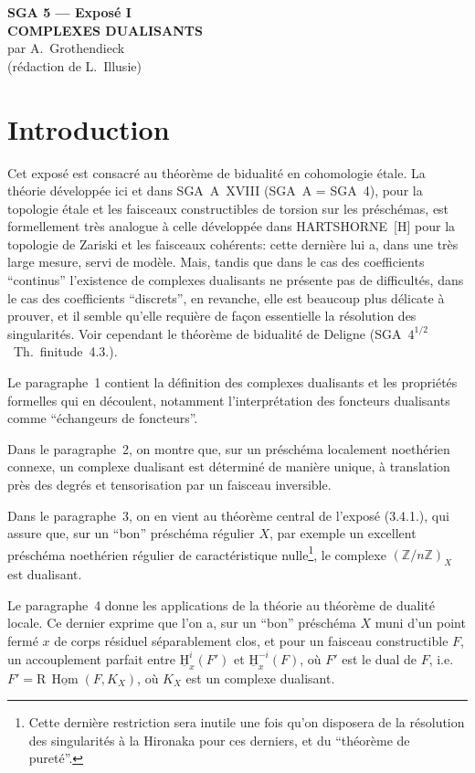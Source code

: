 \documentclass[11pt]{article}
\renewcommand{\H}{\mathrm{H}}
\DeclareMathOperator{\Hom}{Hom}
\newcommand{\R}{\mathrm{R}}
\newcommand{\Z}{\mathbb{Z}}
\providecommand{\Hom}{\operatorname{Hom}}
\providecommand{\R}{\mathrm R}
\providecommand{\Z}{\mathbb Z}
\providecommand{\Hom}{\operatorname{Hom}}
\begin{document}
\begin{center}
{\Large \textbf{SGA 5 --- Exposé I}}\\[0.4em]
{\large \textbf{COMPLEXES DUALISANTS}}\\[0.3em]
par A.~Grothendieck\\
(rédaction de L.~Illusie)
\end{center}

\section*{Introduction}

Cet exposé est consacré au théorème de bidualité en cohomologie étale. La théorie développée ici et dans SGA~A~XVIII (SGA~A = SGA~4), pour la topologie étale et les faisceaux constructibles de torsion sur les préschémas, est formellement très analogue à celle développée dans HARTSHORNE~[H] pour la topologie de Zariski et les faisceaux cohérents: cette dernière lui a, dans une très large mesure, servi de modèle. Mais, tandis que dans le cas des coefficients ``continus'' l'existence de complexes dualisants ne présente pas de difficultés, dans le cas des coefficients ``discrets'', en revanche, elle est beaucoup plus délicate à prouver, et il semble qu'elle requière de façon essentielle la résolution des singularités. Voir cependant le théorème de bidualité de Deligne (SGA~$4^{1/2}$~Th.~finitude~4.3.).

Le paragraphe~1 contient la définition des complexes dualisants et les propriétés formelles qui en découlent, notamment l'interprétation des foncteurs dualisants comme ``échangeurs de foncteurs''.

Dans le paragraphe~2, on montre que, sur un préschéma localement noethérien connexe, un complexe dualisant est déterminé de manière unique, à translation près des degrés et tensorisation par un faisceau inversible.

Dans le paragraphe~3, on en vient au théorème central de l'exposé (3.4.1.), qui assure que, sur un ``bon'' préschéma régulier $X$, par exemple un excellent préschéma noethérien régulier de caractéristique nulle\footnote{Cette dernière restriction sera inutile une fois qu'on disposera de la résolution des singularités à la Hironaka pour ces derniers, et du ``théorème de pureté''.}, le complexe $(\Z/n\Z)_X$ est dualisant.

Le paragraphe~4 donne les applications de la théorie au théorème de dualité locale. Ce dernier exprime que l'on a, sur un ``bon'' préschéma $X$ muni d'un point fermé $x$ de corps résiduel séparablement clos, et pour un faisceau constructible $F$, un accouplement parfait entre $\underline{\H}^i_x(F')$ et $\underline{\H}^{-i}_x(F)$, où $F'$ est le dual de $F$, i.e.\ $F' = \R\,\underline{\Hom}(F,K_X)$, où $K_X$ est un complexe dualisant.
\end{document}
